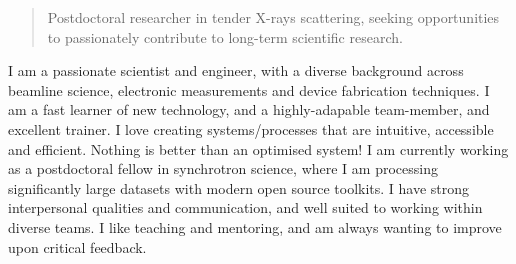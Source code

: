 \documentclass[10pt,a4paper,ragged2e,withhyper]{altacv}
\begin{document}
\begin{paracol}{2}
            \vspace{-0.5em}
        
        \switchcolumn
        
        \vspace{-0.2em}
		
		{\textalignment
            \begin{quote}
            	Postdoctoral researcher in tender X-rays scattering, seeking opportunities to passionately contribute to long-term scientific research.
            \end{quote}
        \vspace{0.5em}
		
		I am a passionate scientist and engineer, with a diverse background across beamline science, electronic measurements and device fabrication techniques. I am a fast learner of new technology, and a highly-adapable team-member, and excellent trainer. I love creating systems/processes that are intuitive, accessible and efficient. Nothing is better than an optimised system! I am currently working as a postdoctoral fellow in synchrotron science, where I am processing significantly large datasets with modern open source toolkits. I have strong interpersonal qualities and communication, and well suited to working within diverse teams. I like teaching and mentoring, and am always wanting to improve upon critical feedback.
		}
        
        \vspace{-1em}


\end{paracol}
\end{document}
